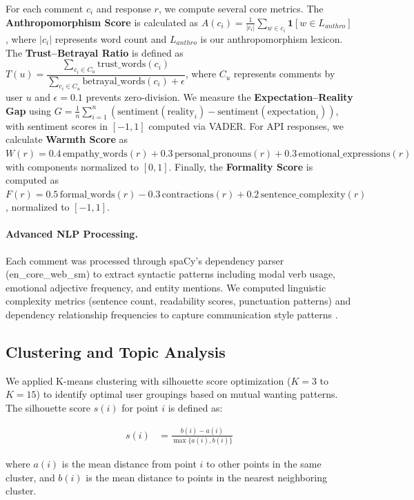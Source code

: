 \documentclass{article}
\begin{document}
For each comment $c_i$ and response $r$, we compute several core metrics. The \textbf{Anthropomorphism Score} is calculated as $A(c_i) = \frac{1}{|c_i|} \sum_{w \in c_i} \mathbf{1}[w \in L_{anthro}]$, where $|c_i|$ represents word count and $L_{anthro}$ is our anthropomorphism lexicon. The \textbf{Trust--Betrayal Ratio} is defined as $T(u) = \dfrac{\sum_{c_i \in C_u} \text{trust\_words}(c_i)}{\sum_{c_i \in C_u} \text{betrayal\_words}(c_i) + \epsilon}$, where $C_u$ represents comments by user $u$ and $\epsilon=0.1$ prevents zero-division. We measure the \textbf{Expectation--Reality Gap} using $G = \frac{1}{n} \sum_{i=1}^{n} (\text{sentiment}(\text{reality}_i) - \text{sentiment}(\text{expectation}_i))$, with sentiment scores in $[-1,1]$ computed via VADER. For API responses, we calculate \textbf{Warmth Score} as $W(r) = 0.4\,\text{empathy\_words}(r) + 0.3\,\text{personal\_pronouns}(r) + 0.3\,\text{emotional\_expressions}(r)$ with components normalized to $[0,1]$. Finally, the \textbf{Formality Score} is computed as $F(r) = 0.5\,\text{formal\_words}(r) - 0.3\,\text{contractions}(r) + 0.2\,\text{sentence\_complexity}(r)$, normalized to $[-1,1]$.

\paragraph{Advanced NLP Processing.}
Each comment was processed through spaCy's dependency parser (en\_core\_web\_sm) to extract syntactic patterns including modal verb usage, emotional adjective frequency, and entity mentions. We computed linguistic complexity metrics (sentence count, readability scores, punctuation patterns) and dependency relationship frequencies to capture communication style patterns \citep{artstein2008agreement, krippendorff2013content}.

\subsection{Clustering and Topic Analysis}

We applied K-means clustering with silhouette score optimization ($K=3$ to $K=15$) to identify optimal user groupings based on mutual wanting patterns. The silhouette score $s(i)$ for point $i$ is defined as:

\begin{align}
s(i) &= \frac{b(i) - a(i)}{\max\{a(i), b(i)\}} \label{eq:silhouette}
\end{align}

where $a(i)$ is the mean distance from point $i$ to other points in the same cluster, and $b(i)$ is the mean distance to points in the nearest neighboring cluster.
\end{document}
